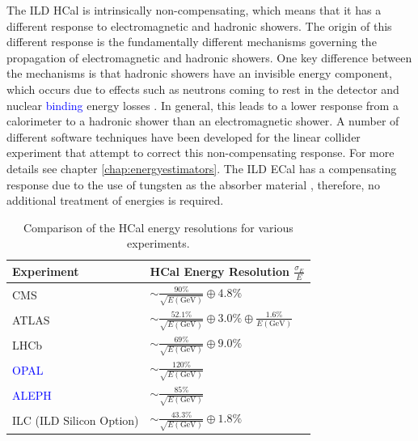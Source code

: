 The ILD HCal is intrinsically non-compensating, which means that it has a different response to electromagnetic and hadronic showers.  The origin of this different response is the fundamentally different mechanisms governing the propagation of electromagnetic and hadronic showers.  One key difference between the mechanisms is that hadronic showers have an invisible energy component, which occurs due to  effects such as neutrons coming to rest in the detector and nuclear \textcolor{blue}{binding} energy losses \cite{Tran:2017tgr}.  In general, this leads to a lower response from a calorimeter to a hadronic shower than an electromagnetic shower.  A number of different software techniques have been developed for the linear collider experiment that attempt to correct this non-compensating response.  For more details see chapter \ref{chap:energyestimators}.  The ILD ECal has a compensating response due to the use of tungsten as the absorber material \cite{Blaising:2015nla}, therefore, no additional treatment of energies is required.

\begin{table}[h!]
\centering
\begin{tabular}{ l l }
\hline
Experiment & HCal Energy Resolution $\frac{\sigma_{E}}{E}$ \\
\hline
CMS \cite{Budd:2001eu} & $\sim \frac{90\%}{\sqrt{E(\text{GeV})}} \oplus 4.8\%$ \\
ATLAS \cite{Airapetian:1996iv} & $\sim \frac{52.1\%}{\sqrt{E(\text{GeV})}} \oplus 3.0\% \oplus \frac{1.6\%}{E(\text{GeV})}$ \\
LHCb \cite{Perret:2014owa} & $\sim \frac{69\%}{\sqrt{E(\text{GeV})}} \oplus 9.0\%$ \\
\textcolor{blue}{OPAL} \cite{Ahmet:1990eg} & $\sim \frac{120\%}{\sqrt{E(\text{GeV})}}$ \\
\textcolor{blue}{ALEPH} \cite{Buskulic:1994wz} & $\sim \frac{85\%}{\sqrt{E(\text{GeV})}}$ \\
ILC (ILD Silicon Option) \cite{Behnke:2013lya} & $\sim \frac{43.3\%}{\sqrt{E(\text{GeV})}} \oplus 1.8\%$ \\
\hline
\end{tabular}
\caption[Comparison of the HCal energy resolutions for various experiments.]{Comparison of the HCal energy resolutions for various experiments.}
\label{table:hcalenergyres}
\end{table}


